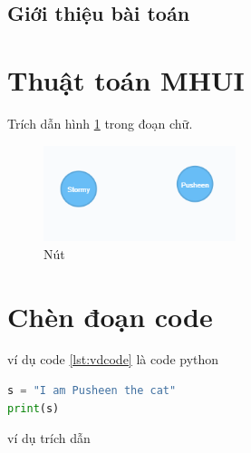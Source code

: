 \subsection{Giới thiệu bài toán}

\section{Thuật toán MHUI}



Trích dẫn hình \ref{fig:node} trong đoạn chữ. 

\begin{figure}[h]
\centering
\includegraphics[width=0.5\textwidth]{image/node.PNG}
\caption{\label{fig:node} Nút}
\end{figure}


\section{Chèn đoạn code}


ví dụ code \ref{lst:vdcode} là code python 


\begin{lstlisting}[caption={Đoạn code}, label={lst:vdcode}, language=python]
s = "I am Pusheen the cat"
print(s)
\end{lstlisting}

ví dụ trích dẫn \cite{robinson2013graph}










